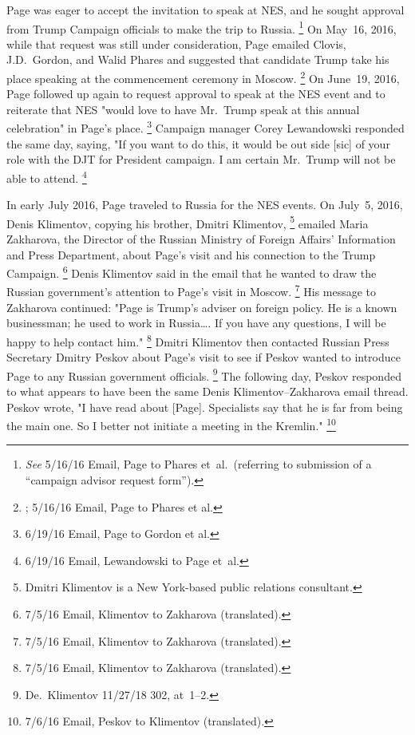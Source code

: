 Page was eager to accept the invitation to speak at NES, and he sought approval from Trump Campaign officials to make the trip to Russia.%
\footnote{\textit{See} 5/16/16 Email, Page to Phares et~al.\
(referring to submission of a ``campaign advisor request form'').}
On May~16, 2016, while that request was still under consideration, Page emailed Clovis, J.D.~Gordon, and Walid Phares and suggested that candidate Trump take his place speaking at the commencement ceremony in Moscow.%
\footnote{\blackout{Grand Jury}; 5/16/16 Email, Page to Phares et al.}
On June~19, 2016, Page followed up again to request approval to speak at the NES event and to reiterate that NES "would love to have Mr.~Trump speak at this annual celebration" in Page's place.%
\footnote{6/19/16 Email, Page to Gordon et al.}
Campaign manager Corey Lewandowski responded the same day, saying, "If you want to do this, it would be out side [sic] of your role with the DJT for President campaign. I am certain Mr.~Trump will not be able to attend.%
\footnote{6/19/16 Email, Lewandowski to Page et~al.}

In early July 2016, Page traveled to Russia for the NES events.
On July~5, 2016, Denis Klimentov, copying his brother, Dmitri Klimentov,%
\footnote{Dmitri Klimentov is a New York-based public relations consultant.}
emailed Maria Zakharova, the Director of the Russian Ministry of Foreign Affairs' Information and Press Department, about Page's visit and his connection to the Trump Campaign.%
\footnote{7/5/16 Email, Klimentov to Zakharova (translated).}
Denis Klimentov said in the email that he wanted to draw the Russian government's attention to Page's visit in Moscow.%
\footnote{7/5/16 Email, Klimentov to Zakharova (translated).}
His message to Zakharova continued: "Page is Trump's adviser on foreign policy.
He is a known businessman; he used to work in Russia\dots.
If you have any questions, I will be happy to help contact him."%
\footnote{7/5/16 Email, Klimentov to Zakharova (translated).}
Dmitri Klimentov then contacted Russian Press Secretary Dmitry Peskov about Page's visit to see if Peskov wanted to introduce Page to any Russian government officials.%
\footnote{De.~Klimentov 11/27/18 302, at~1--2.}
The following day, Peskov responded to what appears to have been the same Denis Klimentov--Zakharova email thread.
Peskov wrote, "I have read about [Page].
Specialists say that he is far from being the main one.
So I better not initiate a meeting in the Kremlin."%
\footnote{7/6/16 Email, Peskov to Klimentov (translated).}

